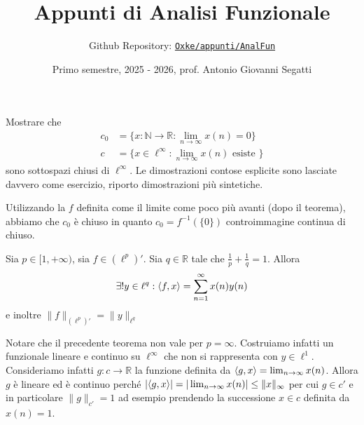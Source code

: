 

\title{Appunti di Analisi Funzionale}
\author{Github Repository:
\href{https://github.com/Oxke/appunti/tree/main/AnalFun}{\texttt{Oxke/appunti/AnalFun}}}
\date{Primo semestre, 2025 \-- 2026, prof. Antonio Giovanni Segatti }



\maketitle





\begin{eser}
    Mostrare che
    \begin{align*}
        c_{0} &= \{x : \mathbb{N} \to \mathbb{R} : \lim_{n \to \infty} x{(n)} = 0\} \\ 
        c &= \{x \in \ell^{\infty} : \lim_{n \to \infty} x{(n)} \text{ esiste }\} 
    \end{align*}
    sono sottospazi chiusi di \(\ell^{\infty}\).
    \tcblower
    Le dimostrazioni contose esplicite sono lasciate davvero come esercizio,
    riporto dimostrazioni più sintetiche.

    Utilizzando la \(f\) definita come il limite come poco più avanti (dopo il
    teorema), abbiamo che \(c_{0}\) è chiuso in quanto \(c_{0} = f^{-1}{(\{0\} )}\)
    controimmagine continua di chiuso.
\end{eser}


\begin{theorem}{}
    Sia \(p \in [1, +\infty)\), sia \(f \in {(\ell^{p})}'\). Sia \(q \in \mathbb{R} \) tale che \(\frac{1}{p} + \frac{1}{q} = 1\). Allora
    \[
      \exists ! y \in \ell^{q} : {\left\langle f, x\right\rangle} = \sum_{n=1}^{\infty} x{(n)}y{(n)} 
    \]
    e inoltre \(\|f\|_{{(\ell^{p})}'} = \|y\|_{\ell^{q}}  \) 
\end{theorem}
Notare che il precedente teorema non vale per \(p = \infty\). Costruiamo infatti
un funzionale lineare e continuo su \(\ell^{\infty}\) che non si rappresenta con
\(y \in \ell^{1}\). Consideriamo infatti
    \(g : c \to \mathbb{R}\) la funzione definita da \({\left\langle g, x\right\rangle} = \lim_{n \to \infty} x{(n)}\). Allora \(g\) è lineare ed è continuo perché \(|{\left\langle g,x\right\rangle} | = | \lim_{n \to \infty} x{(n)} | \le \|x\|_{\infty} \) per cui \(g \in c'\) e in particolare \(\|g\|_{c'} = 1\) ad esempio prendendo la successione \(x \in c\) definita da \(x{(n)} = 1\).

